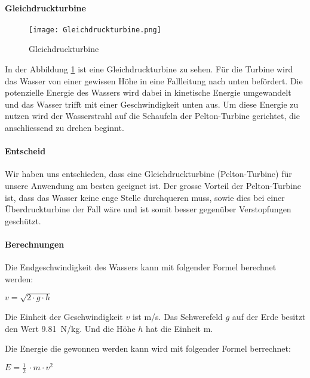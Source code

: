 \paragraph{Gleichdruckturbine}

\begin{figure} [H]
	\centering
	\texttt{[image: Gleichdruckturbine.png]}
	\caption{Gleichdruckturbine \cite{wiki_gleichdruckturbine}}
	\label{fig:Gleichdruckturbine}
\end{figure}

In der Abbildung \ref{fig:Gleichdruckturbine}  ist eine Gleichdruckturbine zu sehen. Für die Turbine wird das Wasser von einer gewissen Höhe in eine Fallleitung nach unten befördert. Die potenzielle Energie des Wassers wird dabei in kinetische Energie umgewandelt und das Wasser trifft mit einer Geschwindigkeit unten aus. Um diese Energie zu nutzen wird der Wasserstrahl auf die Schaufeln der Pelton-Turbine gerichtet, die anschliessend zu drehen beginnt. 

\paragraph{Entscheid}

Wir haben uns entschieden, dass eine Gleichdruckturbine (Pelton-Turbine) für unsere Anwendung am besten geeignet ist. Der grosse Vorteil der Pelton-Turbine ist, dass das Wasser keine enge Stelle durchqueren muss, sowie dies bei einer Überdruckturbine der Fall wäre und ist somit besser gegenüber Verstopfungen geschützt.

\newpage

\paragraph{Berechnungen}

Die Endgeschwindigkeit des Wassers kann mit folgender Formel berechnet werden:
\begin{center}
\(v = \sqrt{2 \cdot g \cdot h} \)
\end{center}

Die Einheit der Geschwindigkeit \(v\) ist \si{m/s}. Das Schwerefeld \(g\) auf der Erde besitzt den Wert 9.81~\si{N/kg}. Und die Höhe \(h\) hat die Einheit \si{m}.

\bigskip

Die Energie die gewonnen werden kann wird mit folgender Formel berrechnet:

\begin{center}
\(E =\frac 12\ \cdot m \cdot v^2\)
\end{center}

